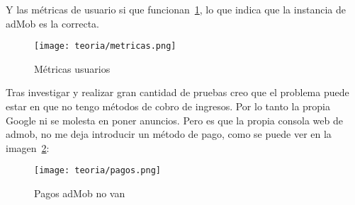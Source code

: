 Y las métricas de usuario si que funcionan~\ref{fig:metricas}, lo que indica que la instancia de adMob es la correcta.

\begin{figure}[H]
	\centering
	\texttt{[image: teoria/metricas.png]}
	\caption{Métricas usuarios}\label{fig:metricas}
\end{figure}

Tras investigar y realizar gran cantidad de pruebas creo que el problema puede estar en que no tengo métodos de cobro de ingresos. Por lo tanto la propia Google ni se molesta en poner anuncios. Pero es que la propia consola web de admob, no me deja introducir un método de pago, como se puede ver en la imagen~\ref{fig:pagos}:

\begin{figure}[H]
	\centering
	\texttt{[image: teoria/pagos.png]}
	\caption{Pagos adMob no van}\label{fig:pagos}
\end{figure}



